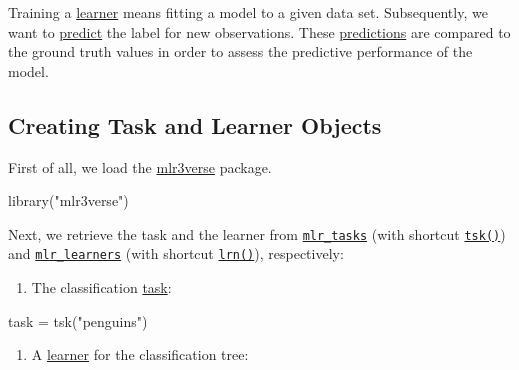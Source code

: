 \documentclass[
]{scrbook}
\newenvironment{Shaded}{\begin{snugshade}}{\end{snugshade}}
\newcommand{\FunctionTok}[1]{\textcolor[rgb]{0.00,0.00,0.00}{#1}}
\newcommand{\NormalTok}[1]{#1}
\newcommand{\OtherTok}[1]{\textcolor[rgb]{0.56,0.35,0.01}{#1}}
\newcommand{\StringTok}[1]{\textcolor[rgb]{0.31,0.60,0.02}{#1}}
\providecommand{\tightlist}{%
  \setlength{\itemsep}{0pt}\setlength{\parskip}{0pt}}
\renewenvironment{Shaded} {\begin{snugshade}\small} {\end{snugshade}}
\begin{document}
Training a \protect\hyperlink{learners}{learner} means fitting a model to a given data set.
Subsequently, we want to \protect\hyperlink{predicting}{predict} the label for new observations.
These \protect\hyperlink{predicting}{predictions} are compared to the ground truth values in order to assess the predictive performance of the model.

\hypertarget{train-predict-objects}{%
\subsection{Creating Task and Learner Objects}\label{train-predict-objects}}

First of all, we load the \href{https://mlr3verse.mlr-org.com}{mlr3verse} package.

\begin{Shaded}
\begin{Highlighting}[]
\FunctionTok{library}\NormalTok{(}\StringTok{"mlr3verse"}\NormalTok{)}
\end{Highlighting}
\end{Shaded}

Next, we retrieve the task and the learner from \href{https://mlr3.mlr-org.com/reference/mlr_tasks.html}{\texttt{mlr\_tasks}} (with shortcut \href{https://mlr3.mlr-org.com/reference/mlr_sugar.html}{\texttt{tsk()}}) and \href{https://mlr3.mlr-org.com/reference/mlr_learners.html}{\texttt{mlr\_learners}} (with shortcut \href{https://mlr3.mlr-org.com/reference/mlr_sugar.html}{\texttt{lrn()}}), respectively:

\begin{enumerate}
\def\labelenumi{\arabic{enumi}.}
\tightlist
\item
  The classification \protect\hyperlink{tasks}{task}:
\end{enumerate}

\begin{Shaded}
\begin{Highlighting}[]
\NormalTok{task }\OtherTok{=} \FunctionTok{tsk}\NormalTok{(}\StringTok{"penguins"}\NormalTok{)}
\end{Highlighting}
\end{Shaded}

\begin{enumerate}
\def\labelenumi{\arabic{enumi}.}
\setcounter{enumi}{1}
\tightlist
\item
  A \protect\hyperlink{learners}{learner} for the classification tree:
\end{enumerate}
\end{document}
